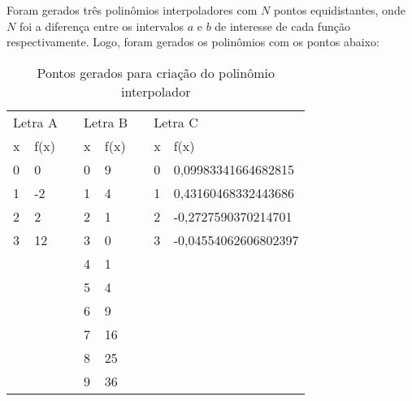 \documentclass[fleqn, 11pt]{article}
\begin{document}
Foram gerados três polinômios interpoladores com $N$ pontos equidistantes, onde $N$ foi a diferença entre os intervalos $a$ e $b$ de interesse de cada função respectivamente. Logo, foram gerados os polinômios com os pontos abaixo:

\begin{table}[H]
\centering
\begin{tabular}{lll|l|l|lll}
\cline{1-2} \cline{4-5} \cline{7-8}
\multicolumn{2}{|l|}{Letra A} &  & \multicolumn{2}{l|}{Letra B} & \multicolumn{1}{l|}{} & \multicolumn{2}{l|}{Letra C} \\ \cline{1-2} \cline{4-5} \cline{7-8} 
\multicolumn{1}{|l|}{x} & \multicolumn{1}{l|}{f(x)} &  & x & f(x) & \multicolumn{1}{l|}{} & \multicolumn{1}{l|}{x} & \multicolumn{1}{l|}{f(x)} \\ \cline{1-2} \cline{4-5} \cline{7-8} 
\multicolumn{1}{|l|}{0} & \multicolumn{1}{l|}{0} &  & 0 & 9 & \multicolumn{1}{l|}{} & \multicolumn{1}{l|}{0} & \multicolumn{1}{l|}{0,09983341664682815} \\ \cline{1-2} \cline{4-5} \cline{7-8} 
\multicolumn{1}{|l|}{1} & \multicolumn{1}{l|}{-2} &  & 1 & 4 & \multicolumn{1}{l|}{} & \multicolumn{1}{l|}{1} & \multicolumn{1}{l|}{0,43160468332443686} \\ \cline{1-2} \cline{4-5} \cline{7-8} 
\multicolumn{1}{|l|}{2} & \multicolumn{1}{l|}{2} &  & 2 & 1 & \multicolumn{1}{l|}{} & \multicolumn{1}{l|}{2} & \multicolumn{1}{l|}{-0,2727590370214701} \\ \cline{1-2} \cline{4-5} \cline{7-8} 
\multicolumn{1}{|l|}{3} & \multicolumn{1}{l|}{12} &  & 3 & 0 & \multicolumn{1}{l|}{} & \multicolumn{1}{l|}{3} & \multicolumn{1}{l|}{-0,04554062606802397} \\ \cline{1-2} \cline{4-5} \cline{7-8} 
 &  &  & 4 & 1 &  &  &  \\ \cline{4-5}
 &  &  & 5 & 4 &  &  &  \\ \cline{4-5}
 &  &  & 6 & 9 &  &  &  \\ \cline{4-5}
 &  &  & 7 & 16 &  &  &  \\ \cline{4-5}
 &  &  & 8 & 25 &  &  &  \\ \cline{4-5}
 &  &  & 9 & 36 &  &  &  \\ \cline{4-5}
\end{tabular}
\caption{Pontos gerados para criação do polinômio interpolador}
\label{Q2Pontos}
\end{table}
\end{document}
